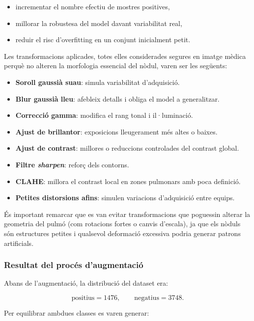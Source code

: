 \documentclass[12pt,a4paper]{article}
\begin{document}
\begin{itemize}
    \item incrementar el nombre efectiu de mostres positives,
    \item millorar la robustesa del model davant variabilitat real,
    \item reduir el risc d’overfitting en un conjunt inicialment petit.
\end{itemize}

Les transformacions aplicades, totes elles considerades segures en imatge mèdica perquè
no alteren la morfologia essencial del nòdul, varen ser les següents:

\begin{itemize}
    \item \textbf{Soroll gaussià suau}: simula variabilitat d’adquisició.
    \item \textbf{Blur gaussià lleu}: afebleix detalls i obliga el model a generalitzar.
    \item \textbf{Correcció gamma}: modifica el rang tonal i il·luminació.
    \item \textbf{Ajust de brillantor}: exposicions lleugerament més altes o baixes.
    \item \textbf{Ajust de contrast}: millores o reduccions controlades del contrast global.
    \item \textbf{Filtre \emph{sharpen}}: reforç dels contorns.
    \item \textbf{CLAHE}: millora el contrast local en zones pulmonars amb poca definició.
    \item \textbf{Petites distorsions afins}: simulen variacions d’adquisició entre equips.
\end{itemize}

És important remarcar que es van evitar transformacions que poguessin alterar la
geometria del pulmó (com rotacions fortes o canvis d’escala), ja que els nòduls són
estructures petites i qualsevol deformació excessiva podria generar patrons artificials.

\subsubsection*{Resultat del procés d’augmentació}

Abans de l’augmentació, la distribució del dataset era:

\[
\text{positius} = 1476, \qquad \text{negatius} = 3748.
\]

Per equilibrar ambdues classes es varen generar:
\end{document}
